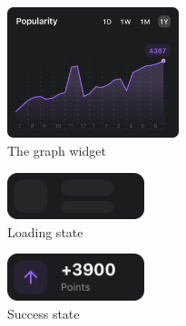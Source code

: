 \documentclass{report}
\begin{document}
\begin{figure}[htp]
    \centering
    \includegraphics[width=5cm]{graph-widget}
    \caption{The graph widget}
    \label{fig:graph-widget}
\end{figure}

\begin{figure}[htp]
    \centering
    \includegraphics[width=4cm]{skeleton-loading}
    \caption{Loading state}
    \label{fig:skeleton-loading}
\end{figure}


\begin{figure}[htp]
    \centering
    \includegraphics[width=4cm]{skeleton-success}
    \caption{Success state}
    \label{fig:skeleton-success}
\end{figure}
\end{document}
